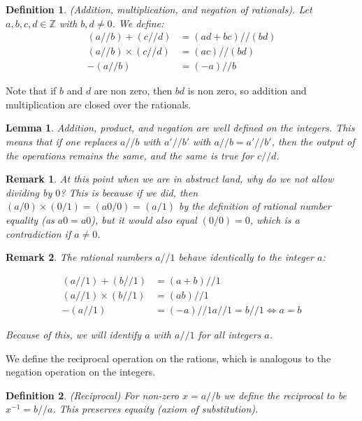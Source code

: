 \documentclass{article}
\newtheorem{definition}{Definition}[subsection]
\newtheorem{remark}{Remark}[subsection]
\newtheorem{lemma}{Lemma}[subsection]
\newcommand{\Z}{\mathbb{Z}}
\begin{document}
\begin{definition}
	(Addition, multiplication, and negation of rationals). 
	Let $a,b,c,d \in \Z$ with $b,d \neq 0$. We define:
	\begin{align*}
		(a//b) + (c//d) &= (ad + bc)//(bd) \\
		(a//b) \times (c//d) &= (ac)//(bd) \\
		-(a//b) &= (-a)//b
	\end{align*}
\end{definition}

Note that if $b$ and $d$ are non zero, then $bd$ is non zero, so addition 
and multiplication are closed over the rationals. 
\begin{lemma}
	Addition, product, and negation are well defined on the integers.
	This means that if one replaces $a//b$ with $a'//b'$ with 
	$a//b = a'//b'$, then the output of the operations remains 
	the same, and the same is true for $c//d$.
\end{lemma}

\begin{remark}
	At this point when we are in abstract land, why do we 
	not allow dividing by $0$? This is because if we did,
	then $(a/0) \times (0/1) = (a0/0) = (a/1)$ by the definition
	of rational number equality (as $a0 = a0$), but it 
	would also equal $(0/0) = 0$, which is a contradiction 
	if $a \neq 0$.
\end{remark}

\begin{remark}
	The rational numbers $a //1$ behave identically to the integer $a$:

	\begin{align*}
		(a // 1) + (b // 1) &= (a + b)//1 \\	
		(a // 1) \times (b // 1) &= (ab)//1 \\ 
		-(a // 1) &= (-a)//1
		a//1  = b//1 \iff a = b
	\end{align*}

	Because of this, we will identify $a$ with $a//1$ for all integers 
	$a$.
\end{remark}

We define the reciprocal operation on the rations, which is 
analogous to the negation operation on the integers.

\begin{definition}
	(Reciprocal) For non-zero $x = a//b$ we define the reciprocal
	to be $x^{-1} = b//a$. This preserves equaity (axiom of 
	substitution).
\end{definition}
\end{document}
